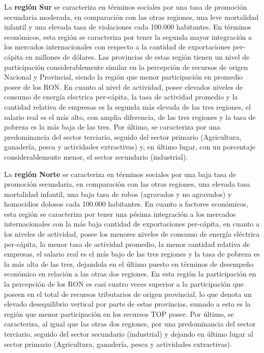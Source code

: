 \documentclass[12pt,a4paper]{article}
\begin{document}
La \textbf{región Sur} se caracteriza en términos sociales por una tasa de promoción secundaria moderada, en comparación con las otras regiones, una leve mortalidad infantil y una elevada tasa de violaciones cada 100.000 habitantes. En términos económicos, esta región se caracteriza por tener la segunda mayor integración a los mercados internacionales con respecto a la cantidad de exportaciones per-cápita en millones de dólares. Las provincias de estas región tienen un nivel de participación considerablemente similar en la percepción de recursos de origen Nacional y Provincial, siendo la región que menor participación en promedio posee de los RON. En cuanto al nivel de actividad, posee elevados niveles de consumo  de energía electrica per-cápita, la tasa de actividad promedio y la cantidad relativa de empresas es la segunda más elevada de las tres regiones, el salario real es el más alto, con amplia diferencia, de las tres regiones y la tasa de pobreza es la más baja de las tres. Por último, se caracteriza por una predominancia del sector terciario, seguido del sector primario (Agricultura, ganadería, pesca y actividades extractivas) y, en último lugar, con un porcentaje considerablemente menor, el sector secundario (industrial).

La \textbf{región Norte} se caracteriza en términos sociales por una baja tasa de promoción secundaria, en comparación con las otras regiones, una elevada tasa mortalidad infantil, una baja tasa de robos (agravados y no agravados) y homocidios dolosos cada 100.000 habitantes.
En cuanto a factores económicos, esta región se caracteriza por tener una pésima integración a los mercados internacionales con la más baja cantidad de exportaciones per-cápita, en cuanto a los niveles de actividad, posee los menores niveles de consumo  de energía eléctrica per-cápita, la menor tasa de actividad promedio, la menor cantidad relativa de empresas, el salario real es el más bajo de las tres regiones y la tasa de pobreza es la más alta de las tres, dejandola en el último puesto en términos de desempeño económico en relación a las otras dos regiones. 
En esta región la participación en la percepción de los RON es casi cuatro veces superior a la participación que poseen en el total de recursos tributarios de origen provincial, lo que denota un elevado desequilibrio vertical por parte de estas provincias, sumado a esto es la región que menor participación en los recursos TOP posee. Por último, se caracteriza, al igual que las otras dos regiones, por una predominancia del sector terciario, seguido del sector secundario (industrial) y dejando en último lugar al sector primario (Agricultura, ganadería, pesca y actividades extractivas).
\end{document}
